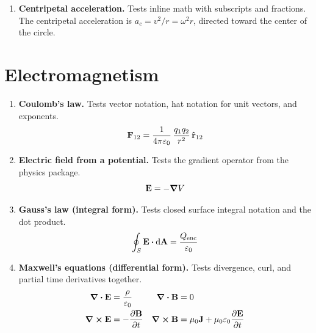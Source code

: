 \documentclass[11pt]{article}
\begin{document}
\begin{enumerate}
\item \textbf{Centripetal acceleration.}
Tests inline math with subscripts and fractions.
The centripetal acceleration is $a_c = v^2/r = \omega^2 r$, directed
toward the center of the circle.

\end{enumerate}

\section{Electromagnetism}

\begin{enumerate}

\item \textbf{Coulomb's law.}
Tests vector notation, hat notation for unit vectors, and exponents.
\[
  \vb{F}_{12} = \frac{1}{4\pi\varepsilon_0}\,
  \frac{q_1 q_2}{r^2}\,\vu{r}_{12}
\]

\item \textbf{Electric field from a potential.}
Tests the gradient operator from the physics package.
\[
  \vb{E} = -\grad V
\]

\item \textbf{Gauss's law (integral form).}
Tests closed surface integral notation and the dot product.
\[
  \oint_S \vb{E} \vdot \dd{\vb{A}} = \frac{Q_{\text{enc}}}{\varepsilon_0}
\]

\item \textbf{Maxwell's equations (differential form).}
Tests divergence, curl, and partial time derivatives together.
\begin{align*}
  \div \vb{E} &= \frac{\rho}{\varepsilon_0}
  & \div \vb{B} &= 0 \\
  \curl \vb{E} &= -\pdv{\vb{B}}{t}
  & \curl \vb{B} &= \mu_0 \vb{J}
    + \mu_0 \varepsilon_0 \pdv{\vb{E}}{t}
\end{align*}


\end{enumerate}
\end{document}
